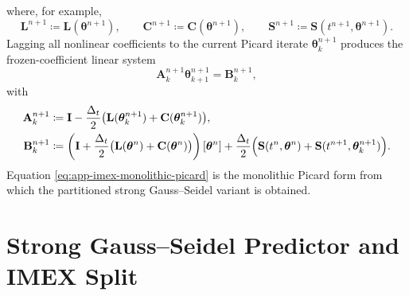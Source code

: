 where, for example,
\[
    \mathbf{L}^{n+1}
    \coloneqq
    \mathbf{L}(\boldsymbol{\theta}^{n+1}),
    \qquad
    \mathbf{C}^{n+1}
    \coloneqq
    \mathbf{C}(\boldsymbol{\theta}^{n+1}),
    \qquad
    \mathbf{S}^{n+1}
    \coloneqq
    \mathbf{S}(t^{n+1},\boldsymbol{\theta}^{n+1}).
\]
Lagging all nonlinear coefficients to the current Picard iterate \(\boldsymbol{\theta}^{n+1}_k\) produces the frozen-coefficient linear system
\begin{equation}
    \mathbf{A}^{n+1}_k \boldsymbol{\theta}^{n+1}_{k+1}
    =
    \mathbf{B}^{n+1}_k,
    \label{eq:app-imex-monolithic-picard}
\end{equation}
with
\begin{align}
    \mathbf{A}^{n+1}_k
     & \coloneqq
    \mathbf{I}
    -
    \frac{\Delta_t}{2}
    \bigl(
    \mathbf{L}(\boldsymbol{\theta}^{n+1}_k)
    +
    \mathbf{C}(\boldsymbol{\theta}^{n+1}_k)
    \bigr),
    \notag       \\
    \mathbf{B}^{n+1}_k
     & \coloneqq
    \left(
    \mathbf{I}
    +
    \frac{\Delta_t}{2}
    \bigl(
    \mathbf{L}(\boldsymbol{\theta}^{n})
    +
    \mathbf{C}(\boldsymbol{\theta}^{n})
    \bigr)
    \right)
    [\boldsymbol{\theta}^{n}]
    +
    \frac{\Delta_t}{2}
    \Bigl(
    \mathbf{S}(t^n,\boldsymbol{\theta}^{n})
    +
    \mathbf{S}(t^{n+1},\boldsymbol{\theta}^{n+1}_k)
    \Bigr).
\end{align}
Equation \eqref{eq:app-imex-monolithic-picard} is the monolithic Picard form from which the partitioned strong Gauss--Seidel variant is obtained.

\section{Strong Gauss--Seidel Predictor and IMEX Split}


